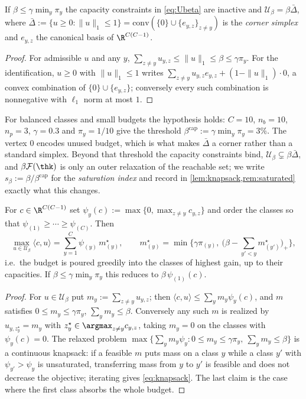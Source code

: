 \begin{lemma}
\label{lem:Ubeta}
If $\beta\le\gamma\min_y\pi_y$ the capacity constraints in \cref{eq:Ubeta} are inactive and $\mathcal{U}_\beta=\beta\bar\Delta$, where $\bar\Delta:=\{u\ge0:\|u\|_1\le1\}=\mathrm{conv}(\{0\}\cup\{e_{y,z}\}_{z\neq y})$ is the \emph{corner simplex} and $e_{y,z}$ the canonical basis of $\R^{C(C-1)}$.
\end{lemma}
\begin{proof}
For admissible $u$ and any $y$, $\sum_{z\neq y}u_{y,z}\le\|u\|_1\le\beta\le\gamma\pi_y$. For the identification, $u\ge0$ with $\|u\|_1\le1$ writes $\sum_{z\neq y}u_{y,z}e_{y,z}+(1-\|u\|_1)\cdot0$, a convex combination of $\{0\}\cup\{e_{y,z}\}$; conversely every such combination is nonnegative with $\ell_1$ norm at most $1$.
\end{proof}

For balanced classes and small budgets the hypothesis holds: $C=10$, $n_b=10$, $n_p=3$,
$\gamma=0.3$ and $\pi_y=1/10$ give the threshold $\beta^{\mathrm{cap}}:=\gamma\min_y\pi_y=3\%$.
The vertex $0$ encodes unused budget, which is what makes $\bar\Delta$ a corner rather than a
standard simplex. Beyond that threshold the capacity constraints bind, $\mathcal{U}_\beta
\subsetneq\beta\bar\Delta$, and $\beta\mathcal{F}(\thk)$ is only an outer relaxation of the
reachable set; we write $s_\beta:=\beta/\beta^{\mathrm{cap}}$ for the \emph{saturation index} and
record in \cref{lem:knapsack,rem:saturated} exactly what this changes.

\begin{lemma}
\label{lem:knapsack}
For $c\in\R^{C(C-1)}$ set $\psi_y(c):=\max\{0,\max_{z\neq y}c_{y,z}\}$ and order the classes so
that $\psi_{(1)}\ge\cdots\ge\psi_{(C)}$. Then
\begin{equation}
\max_{u\in\mathcal{U}_\beta}\langle c,u\rangle=\sum_{y=1}^{C}\psi_{(y)}\,m^\star_{(y)},
\qquad
m^\star_{(y)}=\min\Big\{\gamma\pi_{(y)},\ \big(\beta-\textstyle\sum_{y'<y}m^\star_{(y')}\big)_+\Big\},
\label{eq:knapsack}
\end{equation}
i.e.\ the budget is poured greedily into the classes of highest gain, up to their capacities.
If $\beta\le\gamma\min_y\pi_y$ this reduces to $\beta\,\psi_{(1)}(c)$.
\end{lemma}
\begin{proof}
For $u\in\mathcal{U}_\beta$ put $m_y:=\sum_{z\neq y}u_{y,z}$; then $\langle c,u\rangle\le
\sum_ym_y\psi_y(c)$, and $m$ satisfies $0\le m_y\le\gamma\pi_y$, $\sum_ym_y\le\beta$. Conversely
any such $m$ is realized by $u_{y,z^\star_y}=m_y$ with $z^\star_y\in\argmax_{z\neq y}c_{y,z}$,
taking $m_y=0$ on the classes with $\psi_y(c)=0$. The relaxed problem
$\max\{\sum_ym_y\psi_y:0\le m_y\le\gamma\pi_y,\ \sum_ym_y\le\beta\}$ is a continuous knapsack: if a
feasible $m$ puts mass on a class $y$ while a class $y'$ with $\psi_{y'}>\psi_y$ is unsaturated,
transferring mass from $y$ to $y'$ is feasible and does not decrease the objective; iterating gives
\cref{eq:knapsack}. The last claim is the case where the first class absorbs the whole budget.
\end{proof}


